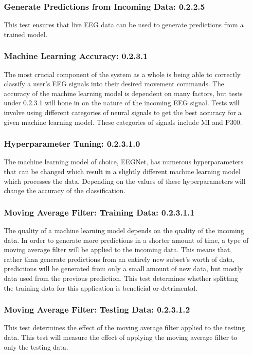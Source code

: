 \documentclass[conference]{IEEEtran}
\begin{document}
        \subsubsection{Generate Predictions from Incoming Data: 0.2.2.5}
        This test ensures that live EEG data can be used to generate predictions from a trained model.
        
        \subsubsection{Machine Learning Accuracy: 0.2.3.1}
        The most crucial component of the system as a whole is being able to correctly classify a user's EEG signals into their desired movement commands. The accuracy of the machine learning model is dependent on many factors, but tests under 0.2.3.1 will hone in on the nature of the incoming EEG signal. Tests will involve using different categories of neural signals to get the best accuracy for a given machine learning model. These categories of signals include MI and P300. 

        \subsubsection{Hyperparameter Tuning: 0.2.3.1.0}
        The machine learning model of choice, EEGNet, has numerous hyperparameters that can be changed which result in a slightly different machine learning model which processes the data. Depending on the values of these hyperparameters will change the accuracy of the classification. 

        \subsubsection{Moving Average Filter: Training Data: 0.2.3.1.1}
        The quality of a machine learning model depends on the quality of the incoming data. In order to generate more predictions in a shorter amount of time, a type of moving average filter will be applied to the incoming data. This means that, rather than generate predictions from an entirely new subset's worth of data, predictions will be generated from only a small amount of new data, but mostly data used from the previous prediction. This test determines whether splitting the training data for this application is beneficial or detrimental. 

        \subsubsection{Moving Average Filter: Testing Data: 0.2.3.1.2}
        This test determines the effect of the moving average filter applied to the testing data. This test will measure the effect of applying the moving average filter to only the testing data. 
\end{document}
